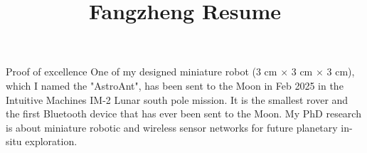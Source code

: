 \documentclass{resume} %
\begin{document}
\title{Fangzheng Resume}

\begin{rSection}{Proof of excellence}
      One of my designed miniature robot (3 cm $\times$ 3 cm $\times$ 3 cm), which I named the "AstroAnt",
      has been sent to the Moon in Feb 2025 in the Intuitive Machines IM-2 Lunar south pole mission.
      It is the smallest rover and the first Bluetooth device that has ever been sent to the Moon.
      My PhD research is about miniature robotic and wireless sensor networks for future planetary in-situ exploration.
\end{rSection}
\end{document}
